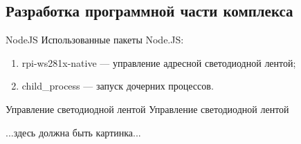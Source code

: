\subsection{Разработка программной части комплекса}

\begin{frame}{NodeJS}
  Использованные пакеты Node.JS:

  \begin{enumerate}
    \item rpi-ws281x-native --- управление адресной светодиодной лентой;
    \item child\_process --- запуск дочерних процессов.
  \end{enumerate}
\end{frame}

\begin{frame}{Управление светодиодной лентой}
  Управление светодиодной лентой

  ...здесь должна быть картинка...
\end{frame}
